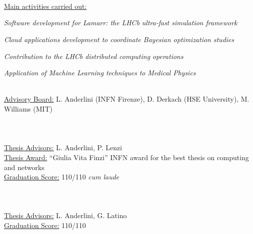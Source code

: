 \begin{cvcontent}
  \\ [0.5mm]
  \\ [1.5mm]
  \\ [1.5mm]
  {\normalsize \color{maincolor} \ul{Main activities carried out:}\\ [1.5mm]
  \begin{itemize*}[label=\textcolor{iconcolor}{\textbullet}]
    \item \emph{Software development for Lamarr: the LHCb ultra-fast simulation framework}\\ [0.5mm]
    \item \emph{Cloud applications development to coordinate Bayesian optimization studies}\\ [0.5mm]
    \item \emph{Contribution to the LHCb distributed computing operations}\\ [0.5mm]
    \item \emph{Application of Machine Learning techniques to Medical Physics}
  \end{itemize*}}\\ [1.5mm]
  \ul{Advisory Board:} L. Anderlini (INFN Firenze), D. Derkach (HSE University), M. Williams (MIT)
  \\ [5mm]
  \\ [0.5mm]
  \\ [1.5mm]
  \\ [1.5mm]
  \ul{Thesis Advisors:} L. Anderlini, P. Lenzi\\ [1.5mm]
  \ul{Thesis Award:} ``Giulia Vita Finzi'' INFN award for the best thesis on computing and networks\\ [1.5mm]
  \ul{Graduation Score:} 110/110 \emph{cum laude}
  \\ [5mm]
  \\ [0.5mm]
  \\ [1.5mm]
  \\ [1.5mm]
  \ul{Thesis Advisors:} L. Anderlini, G. Latino\\ [1.5mm]
  \ul{Graduation Score:} 110/110
\end{cvcontent}